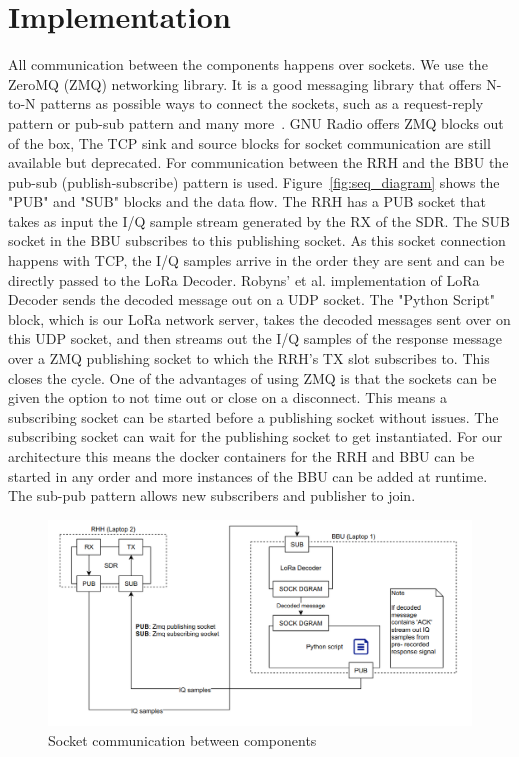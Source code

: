 \section{Implementation}
All communication between the components happens over sockets. We use the ZeroMQ (ZMQ) networking library.
It is a good messaging library that offers N-to-N patterns as possible ways to connect the sockets, such as a request-reply pattern
or pub-sub pattern and many more~\cite{zeromq}.
GNU Radio offers ZMQ blocks out of the box, The TCP sink and source blocks for socket communication are still available but deprecated. 
For communication between the RRH and the BBU the pub-sub (publish-subscribe) pattern is used.
Figure~\ref{fig:seq_diagram} shows the "PUB" and "SUB" blocks and the data flow.
The RRH has a PUB socket that takes as input the I/Q sample stream generated by the RX of the SDR.
The SUB socket in the BBU subscribes to this publishing socket. As this socket connection happens with TCP, the I/Q samples arrive in the order
they are sent and can be directly passed to the LoRa Decoder. Robyns' et al. implementation of LoRa Decoder sends the decoded message 
out on a UDP socket. The "Python Script" block, which is our LoRa network server, takes the decoded messages sent over on this UDP socket,
and then streams out the 
I/Q samples of the response message over a ZMQ publishing socket to which the RRH's TX slot subscribes to. This closes the cycle.
One of the advantages of using ZMQ is that the sockets can be given the option to not time out or close on a disconnect. This means a subscribing socket 
can be started before a publishing socket without issues. The subscribing socket can wait for the publishing socket to get instantiated. For our architecture 
this means the docker containers for the RRH and BBU can be started in any order and more instances of the BBU can be added at runtime. The sub-pub pattern 
allows new subscribers and publisher to join.

\begin{figure}[h]
    \centering
    \includegraphics[width=1\textwidth]{figures/impl_diagram.png}
    \caption{Socket communication between components}
    \label{fig:impl_diagram}
\end{figure}

